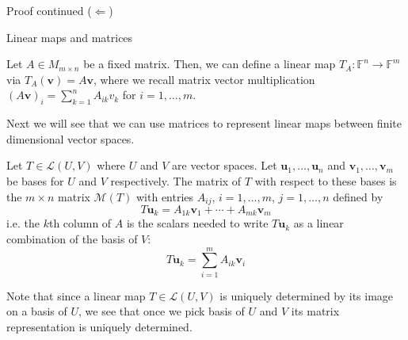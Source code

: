 \documentclass [aspectratio=169]{beamer}
\newcommand{\bu}{{\mathbf{u}}}
\newcommand{\bv}{{\mathbf{v}}}
\newcommand{\F}{{\mathbb{F}}}
\begin{document}
\begin{frame}
\begin{block}{Proof continued}
($\Leftarrow$) 
\vspace{4cm}
\end{block}
\end{frame}


\begin{frame}{Linear maps and matrices}
\begin{example}
Let $A\in M_{m\times n}$ be a fixed matrix. Then, we can define a linear map $T_A \colon \F^n \to \F^m$ via $T_A(\bv) = A \bv$, where we recall matrix vector multiplication $(A\bv)_i = \sum_{k=1}^n A_{ik}v_k$ for $i=1, \ldots, m$.
\end{example}

Next we will see that we can use matrices to represent linear maps between finite dimensional vector spaces. 


\end{frame}



\begin{frame}
\begin{definition}\label{def:matrix_rep}
Let $T \in \mathcal{L}(U,V)$ where $U$ and $V$ are vector spaces. Let $\bu_1, \ldots, \bu_n$ and $\bv_1, \ldots, \bv_m$ be bases for $U$ and $V$ respectively. The matrix of $T$ with respect to these bases is the $m \times n$ matrix $\mathcal{M}(T)$ with entries $A_{ij}$, $i = 1, \ldots, m$, $j = 1, \ldots, n$ defined by
\begin{equation*}
    T\bu_k = A_{1k} \bv_1 + \cdots + A_{mk} \bv_m
\end{equation*}
i.e. the $k$th column of $A$ is the scalars needed to write $T \bu_k$ as a linear combination of the basis of $V$:
\begin{equation*}
    T \bu_k = \sum_{i=1}^m A_{ik} \bv_i 
\end{equation*}
\end{definition}

Note that since a linear map $T\in \mathcal{L}(U,V)$ is uniquely determined by its image on a basis of $U$, we see that once we pick basis of $U$ and $V$ its matrix representation is uniquely determined. 

\end{frame}
\end{document}
